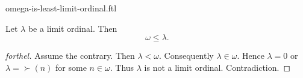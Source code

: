 \documentclass{naproche-library}
\begin{document}
\begin{smodule}[title=$\omega$ is the Least Limit Ordinal]{omega-is-least-limit-ordinal.ftl}

\begin{proposition}[forthel,id=SET_THEORY_03_5517271459954688]
  Let $\lambda$ be a limit ordinal.
  Then \[ \omega \leq \lambda. \]
\end{proposition}
\begin{proof}[forthel]
  Assume the contrary.
  Then $\lambda < \omega$.
  Consequently $\lambda \in \omega$.
  Hence $\lambda = 0$ or $\lambda = \succ(n)$ for some $n \in \omega$.
  Thus $\lambda$ is not a limit ordinal.
  Contradiction.
\end{proof}
\end{smodule}
\end{document}
